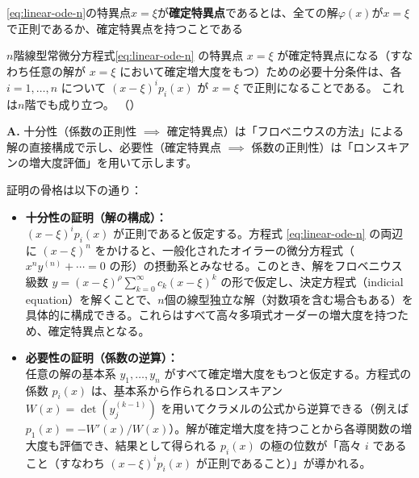 \begin{definition}
    \eqref{eq:linear-ode-n}の特異点$x=\xi$が\textbf{確定特異点}であるとは、全ての解$\varphi(x)$が$x=\xi$で正則であるか、確定特異点を持つことである
\end{definition}

\begin{proposition}[フックスの定理]\label{prop:fuchs_theorem_n}
    $n$階線型常微分方程式\eqref{eq:linear-ode-n}
    の特異点 $x=\xi$ が確定特異点になる（すなわち任意の解が $x=\xi$ において確定増大度をもつ）ための必要十分条件は、各 $i=1,\dots,n$ について $(x-\xi)^{i}p_{i}(x)$ が $x=\xi$ で正則になることである。
    これは$n$階でも成り立つ。
    （\cite[定理13.4 p.128]{book:takano}）
\end{proposition}

\begin{Q}
\textbf{A.} 十分性（係数の正則性 $\implies$ 確定特異点）は「フロベニウスの方法」による解の直接構成で示し、必要性（確定特異点 $\implies$ 係数の正則性）は「ロンスキアンの増大度評価」を用いて示します。

証明の骨格は以下の通り：
\begin{itemize}
    \item \textbf{十分性の証明（解の構成）：}\\
    $(x-\xi)^{i}p_{i}(x)$ が正則であると仮定する。方程式 \eqref{eq:linear-ode-n} の両辺に $(x-\xi)^n$ をかけると、一般化されたオイラーの微分方程式（$x^n y^{(n)} + \cdots = 0$ の形）の摂動系とみなせる。このとき、解をフロベニウス級数 $y = (x-\xi)^{\rho} \sum_{k=0}^{\infty} c_k (x-\xi)^k$ の形で仮定し、決定方程式（indicial equation）を解くことで、$n$個の線型独立な解（対数項を含む場合もある）を具体的に構成できる。これらはすべて高々多項式オーダーの増大度を持つため、確定特異点となる。

    \item \textbf{必要性の証明（係数の逆算）：}\\
    任意の解の基本系 $y_1, \dots, y_n$ がすべて確定増大度をもつと仮定する。方程式の係数 $p_i(x)$ は、基本系から作られるロンスキアン $W(x) = \det(y_j^{(k-1)})$ を用いてクラメルの公式から逆算できる（例えば $p_1(x) = -W'(x)/W(x)$）。解が確定増大度を持つことから各導関数の増大度も評価でき、結果として得られる $p_i(x)$ の極の位数が「高々 $i$ であること（すなわち $(x-\xi)^i p_i(x)$ が正則であること）」が導かれる。
\end{itemize}
\end{Q}

